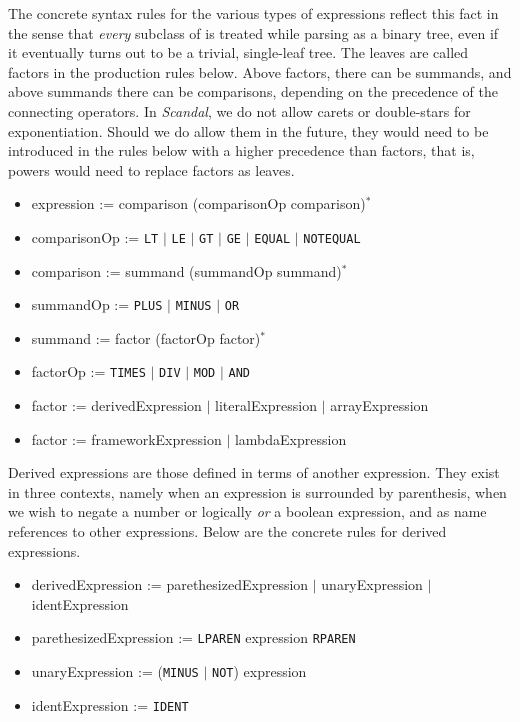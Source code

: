 The concrete syntax rules for the various types of expressions reflect this fact in the sense that \emph{every} subclass of  is treated while parsing as a binary tree, even if it eventually turns out to be a trivial, single-leaf tree. The leaves are called factors in the production rules below. Above factors, there can be summands, and above summands there can be comparisons, depending on the precedence of the connecting operators. In \emph{Scandal}, we do not allow carets or double-stars for exponentiation. Should we do allow them in the future, they would need to be introduced in the rules below with a higher precedence than factors, that is, powers would need to replace factors as leaves.

\begin{itemize}
	\item expression := comparison (comparisonOp comparison)$^*$
	\item comparisonOp := \texttt{LT} $|$ \texttt{LE} $|$ \texttt{GT} $|$ \texttt{GE} $|$ \texttt{EQUAL} $|$ \texttt{NOTEQUAL}
	\item comparison := summand (summandOp summand)$^*$
	\item summandOp := \texttt{PLUS} $|$ \texttt{MINUS} $|$ \texttt{OR}
	\item summand := factor (factorOp factor)$^*$
	\item factorOp := \texttt{TIMES} $|$ \texttt{DIV} $|$ \texttt{MOD} $|$ \texttt{AND}
	\item factor := derivedExpression $|$ literalExpression $|$ arrayExpression
	\item factor := frameworkExpression $|$ lambdaExpression
\end{itemize}

Derived expressions are those defined in terms of another expression. They exist in three contexts, namely when an expression is surrounded by parenthesis, when we wish to negate a number or logically \emph{or} a boolean expression, and as name references to other expressions. Below are the concrete rules for derived expressions.

\begin{itemize}
	\item derivedExpression := parethesizedExpression $|$ unaryExpression $|$ identExpression
	\item parethesizedExpression := \texttt{LPAREN} expression \texttt{RPAREN}
	\item unaryExpression := (\texttt{MINUS} $|$ \texttt{NOT}) expression
	\item identExpression := \texttt{IDENT}
\end{itemize}

